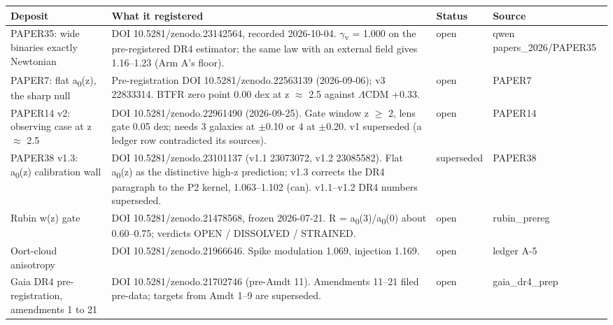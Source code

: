 \documentclass[10pt]{article}
\begin{document}
{\footnotesize\begin{longtable}{>{\raggedright\arraybackslash}p{5.2cm}>{\raggedright\arraybackslash}p{13.0cm}>{\raggedright\arraybackslash}p{1.8cm}>{\raggedright\arraybackslash}p{2.4cm}}
\toprule\textbf{Deposit} & \textbf{What it registered} & \textbf{Status} & \textbf{Source}\\\midrule\endhead

PAPER35: wide binaries exactly Newtonian & DOI 10.5281/zenodo.23142564, recorded 2026-10-04. \ensuremath{\gamma}\textsubscript{v} = 1.000 on the pre-registered DR4 estimator; the same law with an external field gives 1.16--1.23 (Arm A's floor). & open & qwen papers\_2026/PAPER35 \\

PAPER7: flat a\textsubscript{0}(z), the sharp null & Pre-registration DOI 10.5281/zenodo.22563139 (2026-09-06); v3 22833314. BTFR zero point 0.00 dex at z \ensuremath{\approx} 2.5 against \ensuremath{\Lambda}CDM +0.33. & open & PAPER7 \\

PAPER14 v2: observing case at z \ensuremath{\approx} 2.5 & DOI 10.5281/zenodo.22961490 (2026-09-25). Gate window z \ensuremath{\geq} 2, lens gate 0.05 dex; needs 3 galaxies at \ensuremath{\pm}0.10 or 4 at \ensuremath{\pm}0.20. v1 superseded (a ledger row contradicted its sources). & open & PAPER14 \\

PAPER38 v1.3: a\textsubscript{0}(z) calibration wall & DOI 10.5281/zenodo.23101137 (v1.1 23073072, v1.2 23085582). Flat a\textsubscript{0}(z) as the distinctive high-z prediction; v1.3 corrects the DR4 paragraph to the P2 kernel, 1.063--1.102 (can). v1.1--v1.2 DR4 numbers superseded. & superseded & PAPER38 \\

Rubin w(z) gate & DOI 10.5281/zenodo.21478568, frozen 2026-07-21. R = a\textsubscript{0}(3)/a\textsubscript{0}(0) about 0.60--0.75; verdicts OPEN / DISSOLVED / STRAINED. & open & rubin\_prereg \\

Oort-cloud anisotropy & DOI 10.5281/zenodo.21966646. Spike modulation 1.069, injection 1.169. & open & ledger A-5 \\

Gaia DR4 pre-registration, amendments 1 to 21 & DOI 10.5281/zenodo.21702746 (pre-Amdt 11). Amendments 11--21 filed pre-data; targets from Amdt 1--9 are superseded. & open & gaia\_dr4\_prep \\


\end{longtable}}
\end{document}

